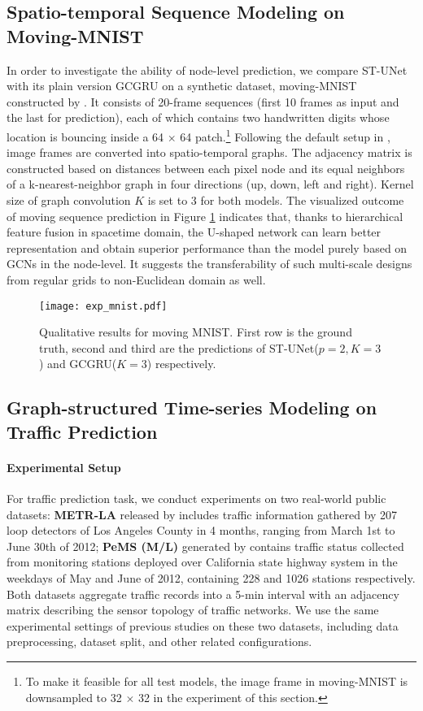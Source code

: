 \documentclass[sigconf,screen]{acmart}
\begin{document}
\subsection{Spatio-temporal Sequence Modeling on Moving-MNIST}
In order to investigate the ability of node-level prediction, we compare ST-UNet with its plain version GCGRU on a synthetic dataset, moving-MNIST constructed by \cite{xingjian2015convolutional}. It consists of 20-frame sequences (first 10 frames as input and the last for prediction), each of which contains two handwritten digits whose location is bouncing inside a 64 $\times$ 64 patch.\footnote{To make it feasible for all test models, the image frame in moving-MNIST is downsampled to 32 $\times$ 32 in the experiment of this section.} Following the default setup in \cite{seo2018structured}, image frames are converted into spatio-temporal graphs. The adjacency matrix is constructed based on distances between each pixel node and its equal neighbors of a k-nearest-neighbor graph in four directions (up, down, left and right). Kernel size of graph convolution $K$ is set to 3 for both models. The visualized outcome of moving sequence prediction in Figure \ref{fig:mmnist} indicates that, thanks to hierarchical feature fusion in spacetime domain, the U-shaped network can learn better representation and obtain superior performance than the model purely based on GCNs in the node-level. It suggests the transferability of such multi-scale designs from regular grids to non-Euclidean domain as well.

\begin{figure}
  \centering
  \texttt{[image: exp\_mnist.pdf]}
  \caption{\label{fig:mmnist}Qualitative results for moving MNIST. First row is the ground truth, second and third are the predictions of ST-UNet($p=2, K=3$) and GCGRU($K=3$) respectively.}
\end{figure}

\subsection{Graph-structured Time-series Modeling on Traffic Prediction}
\paragraph{Experimental Setup} 
For traffic prediction task, we conduct experiments on two real-world public datasets: \textbf{METR-LA} released by \cite{li2018dcrnn_traffic} includes traffic information gathered by 207 loop detectors of Los Angeles County in 4 months, ranging from March 1st to June 30th of 2012; \textbf{PeMS (M/L)} generated by \cite{yu2018spatio} contains traffic status collected from monitoring stations deployed over California state highway system in the weekdays of May and June of 2012, containing 228 and 1026 stations respectively. Both datasets aggregate traffic records into a 5-min interval with an adjacency matrix describing the sensor topology of traffic networks. We use the same experimental settings of previous studies on these two datasets, including data preprocessing, dataset split, and other related configurations.
\end{document}
